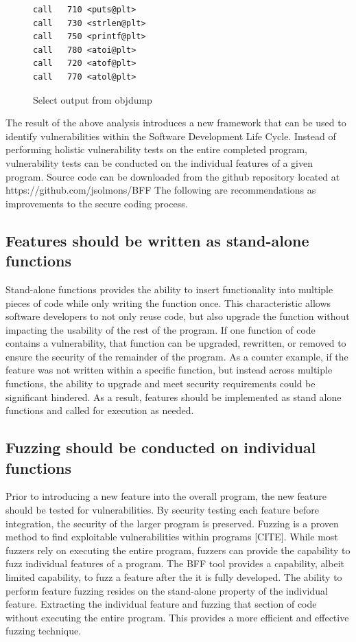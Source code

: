 \documentclass[conference]{IEEEtran}
\begin{document}
\begin{figure}
\begin{lstlisting}
call   710 <puts@plt>
call   730 <strlen@plt>
call   750 <printf@plt>
call   780 <atoi@plt>
call   720 <atof@plt>
call   770 <atol@plt>
\end{lstlisting}
\caption{Select output from objdump}
\end{figure}

The result of the above analysis introduces a new framework that can be used to identify vulnerabilities within the Software Development Life Cycle. Instead of performing holistic vulnerability tests on the entire completed program, vulnerability tests can be conducted on the individual features of a given program. Source code can be downloaded from the github repository located at https://github.com/jsolmons/BFF The following are recommendations as improvements to the secure coding process.

\subsection{Features should be written as stand-alone functions}
Stand-alone functions provides the ability to insert functionality into multiple pieces of code while only writing the function once. This characteristic allows software developers to not only reuse code, but also upgrade the function without impacting the usability of the rest of the program. If one function of code contains a vulnerability, that function can be upgraded, rewritten, or removed to ensure the security of the remainder of the program. As a counter example, if the feature was not written within a specific function, but instead across multiple functions, the ability to upgrade and meet security requirements could be significant hindered. As a result, features should be implemented as stand alone functions and called for execution as needed. 

\subsection{Fuzzing should be conducted on individual functions}
Prior to introducing a new feature into the overall program, the new feature should be tested for vulnerabilities. By security testing each feature before integration, the security of the larger program is preserved. Fuzzing is a proven method to find exploitable vulnerabilities within programs [CITE]. While most fuzzers rely on executing the entire program, fuzzers can provide the capability to fuzz individual features of a program. The BFF tool provides a capability, albeit limited capability, to fuzz a feature after the it is fully developed. The ability to perform feature fuzzing resides on the stand-alone property of the individual feature. Extracting the individual feature and fuzzing that section of code without executing the entire program. This provides a more efficient and effective fuzzing technique. 
\end{document}
